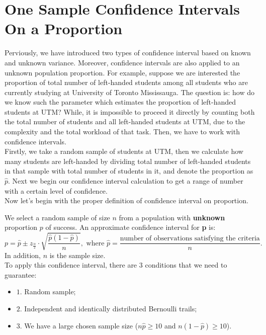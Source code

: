 \chapter{One Sample Confidence Intervals On a Proportion}

Perviously, we have introduced two types of confidence interval based on known and unknown variance. Moreover, confidence intervals are also applied to an unknown population proportion. For example, suppose we are interested the proportion of total number of left-handed students among all students who are currently studying at University of Toronto Mississauga. The question is: how do we know such the parameter which estimates the proportion of left-handed students at UTM? While, it is impossible to proceed it directly by counting both the total number of students and all left-handed students at UTM, due to the complexity and the total workload of that task. Then, we have to work with confidence intervals.\\

\noindent
Firstly, we take a random sample of students at UTM, then we calculate how many students are left-handed by dividing total number of left-handed students in that sample with total number of students in it, and denote the proportion as $\hat{p}$. Next we begin our confidence interval calculation to get a range of number with a certain level of confidence.\\

\noindent
Now let's begin with the proper definition of confidence interval on proportion.

\begin{definition}
We select a random sample of size $n$ from a population with \textbf{unknown} proportion $p$ of success. An approximate confidence interval for \textbf{p} is: \[ p = \hat{p}  \pm z_{\frac{\alpha}{2}} \cdot \sqrt{\frac{\hat{p}(1 - \hat{p})}{n}}, \text{ where $\hat{p} = \frac{\text{number of observations satisfying the criteria}}{n}$.}\]
In addition, $n$ is the sample size.\\
To apply this confidence interval, there are $3$ conditions that we need to guarantee:
\begin{itemize}
	\item $1$. Random sample;
	\item $2$. Independent and identically distributed Bernoulli trails;
	\item $3$. We have a large chosen sample size ($n\hat{p} \ge 10$ and $n(1-\hat{p}) \ge 10$).
\end{itemize}
\end{definition}

